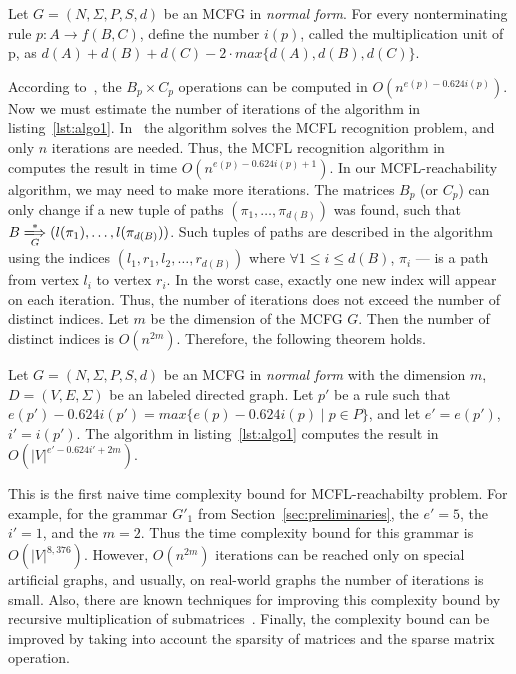 \begin{definition}
Let $G = (N, \Sigma, P, S, d)$ be an MCFG in \emph{normal form}. For every nonterminating rule $p: A \rightarrow f(B,C)$, define the number $i(p)$, called the multiplication unit of p, as $d(A) + d(B) + d(C) - 2 \cdot max\{d(A), d(B), d(C)\}$.
\end{definition}

According to~\cite{nakanishi1997efficient}, the $B_p \times C_p$ operations can be computed in $O(n^{e(p) - 0.624i(p)})$. Now we must estimate the number of iterations of the algorithm in listing~\ref{lst:algo1}. In~\cite{nakanishi1997efficient} the algorithm solves the MCFL recognition problem, and only $n$ iterations are needed. Thus, the MCFL recognition algorithm in~\cite{nakanishi1997efficient} computes the result in time $O(n^{e(p) - 0.624i(p) + 1})$. In our MCFL-reachability algorithm, we may need to make more iterations. The matrices $B_p$ (or $C_p$) can only change if a new tuple of paths $(\pi_1, \ldots, \pi_{d(B)})$ was found, such that $B \xLongrightarrow[G]{*} (l(\pi_1), \dots, l(\pi_{d(B)}))$. Such tuples of paths are described in the algorithm using the indices $(l_1, r_1, l_2, \ldots, r_{d(B)})$ where $\forall 1 \leq i \leq d(B)$, $\pi_i$ --- is a path from vertex $l_i$ to vertex $r_i$. In the worst case, exactly one new index will appear on each iteration. Thus, the number of iterations does not exceed the number of distinct indices. Let $m$ be the dimension of the MCFG $G$. Then the number of distinct indices is $O(n^{2m})$. Therefore, the following theorem holds.

\begin{mytheorem}\label{thm:complexity}
Let $G = (N, \Sigma, P, S, d)$ be an MCFG in \emph{normal form} with the dimension $m$, $D =(V, E, \Sigma)$ be an labeled directed graph. Let $p'$ be a rule such that $e(p') - 0.624i(p') = max\{e(p) - 0.624i(p) \mid p\in P\}$, and let $e' = e(p')$, $i' = i(p')$. The algorithm in listing~\ref{lst:algo1} computes the result in $O(|V|^{e' - 0.624i' + 2m})$.
\end{mytheorem}

This is the first naive time complexity bound for MCFL-reachabilty problem. For example, for the grammar $G'_1$ from Section~\ref{sec:preliminaries}, the $e' = 5$, the $i' = 1$, and the $m = 2$. Thus the time complexity bound for this grammar is $O(|V|^{8,376})$. However, $O(n^{2m})$ iterations can be reached only on special artificial graphs, and usually, on real-world graphs the number of iterations is small. Also, there are known techniques for improving this complexity bound by recursive multiplication of submatrices~\cite{valiant1975general}. Finally, the complexity bound can be improved by taking into account the sparsity of matrices and the sparse matrix operation.